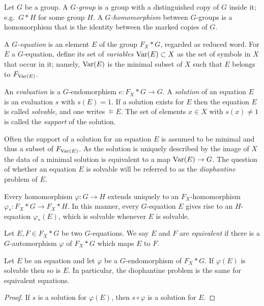 \documentclass[a4paper,11pt]{amsart}
\begin{document}
\begin{defi}
  Let $G$ be a group. A \emph{$G$-group} is a group with a
  distinguished copy of $G$ inside it; e.g.\ $G*H$ for some group
  $H$. A \emph{$G$-homomorphism} between $G$-groups is a homomorphism
  that is the identity between the marked copies of $G$.

  A \emph{$G$-equation} is an element $E$ of the group $F_X * G$,
  regarded as reduced word. For $E$ a $G$-equation, define its set of
  \emph{variables} $\textup{Var}(E)\subset X$ as the set of symbols in $X$
  that occur in it; namely, $\textup{Var}(E)$ is the minimal subset of $X$
  such that $E$ belongs to $F_{\textup{Var}(E)}$.

  An \emph{evaluation} is a $G$-endomorphism $e\colon F_X * G \to G$.
  A \emph{solution} of an equation $E$ is an evaluation $s$ with
  $s(E)=1$. If a solution exists for $E$ then the equation $E$ is
  called \emph{solvable}, and one writes $\models E$.  The set of
  elements $x\in X$ with $s(x)\neq 1$ is called the \emph{support} of
  the solution.
\end{defi}

Often the support of a solution for an equation $E$ is assumed to be
minimal and thus a subset of $F_{\textup{Var}(E)}$.  As the solution is
uniquely described by the image of $X$ the data of a minimal solution
is equivalent to a map $\textup{Var}(E) \to G$.  The question of whether an
equation $E$ is solvable will be referred to as the \emph{diophantine}
problem of $E$.

Every homomorphism $\varphi \colon G \to H$ extends uniquely to an
$F_X$-ho\-mo\-morphism $\varphi_* \colon F_X*G \to F_X*H$. In this manner,
every $G$-equation $E$ gives rise to an $H$-equation $\varphi_*(E)$,
which is solvable whenever $E$ is solvable.

\begin{defi}
  Let $E,F\in F_X* G$ be two $G$-equations. We say $E$ and $F$ are
  \emph{equivalent} if there is a $G$-automorphism $\varphi$ of
  $F_X*G$ which maps $E$ to $F$.
\end{defi}
\begin{lem}
  Let $E$ be an equation and let $\varphi$ be a $G$-endomorphism of
  $F_X*G$. If $\varphi(E)$ is solvable then so is $E$. In particular,
  the diophantine problem is the same for equivalent equations.
\end{lem}
\begin{proof}
  If $s$ is a solution for $\varphi(E)$, then $s\circ\varphi$ is a
  solution for $E$.
\end{proof}
\end{document}
